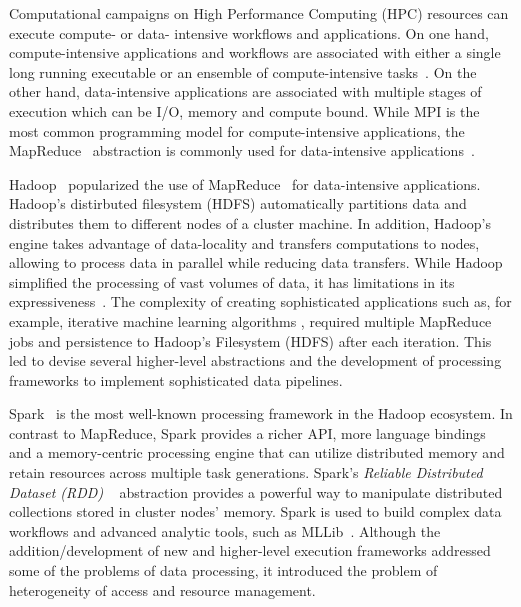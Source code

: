 \label{ch:pilot-data-hadoop}

Computational campaigns on High Performance Computing (HPC) resources can execute compute- or data- intensive workflows and applications.
On one hand, compute-intensive applications and workflows are associated with either a single long running executable or an ensemble of compute-intensive tasks~\cite{balasubramanian2018harnessing}.
On the other hand, data-intensive applications are associated with multiple stages of execution which can be I/O, memory and compute bound.
While MPI is the most common programming model for compute-intensive applications, the MapReduce~\cite{dean2004mapreduce} abstraction is commonly used for data-intensive applications~\cite{hellerstein2012science}.


Hadoop~\cite{hadoop} popularized the use of MapReduce~\cite{dean2004mapreduce} for data-intensive applications.
Hadoop's distirbuted filesystem (HDFS) automatically partitions data and distributes them to different nodes of a cluster machine.
In addition, Hadoop's engine takes advantage of data-locality and transfers computations to nodes, allowing to process data in parallel while reducing data transfers.
While Hadoop simplified the processing of vast volumes of data, it has limitations in its expressiveness~\cite{yelick2011magellan,isard2007dryad}.
The complexity of creating sophisticated applications such as, for example, iterative machine learning algorithms , required multiple MapReduce jobs and persistence to Hadoop's Filesystem (HDFS) after each iteration.
This led to devise several higher-level abstractions and the development of processing frameworks to implement sophisticated data pipelines.

Spark~\cite{zaharia2010spark} is the most well-known processing framework in the Hadoop ecosystem.
In contrast to MapReduce, Spark provides a richer API, more language bindings and a memory-centric processing engine that can utilize distributed memory and retain resources across multiple task generations.
Spark's \emph{Reliable Distributed Dataset (RDD)} ~\cite{zaharia2012resilient} abstraction provides a powerful way to manipulate distributed collections stored in cluster nodes' memory.
Spark is used to build complex data workflows and advanced analytic tools, such as MLLib~\cite{mllib}.
Although the addition/development of new and higher-level execution frameworks addressed some of the problems of data processing, it introduced the problem of heterogeneity of access and resource management.

